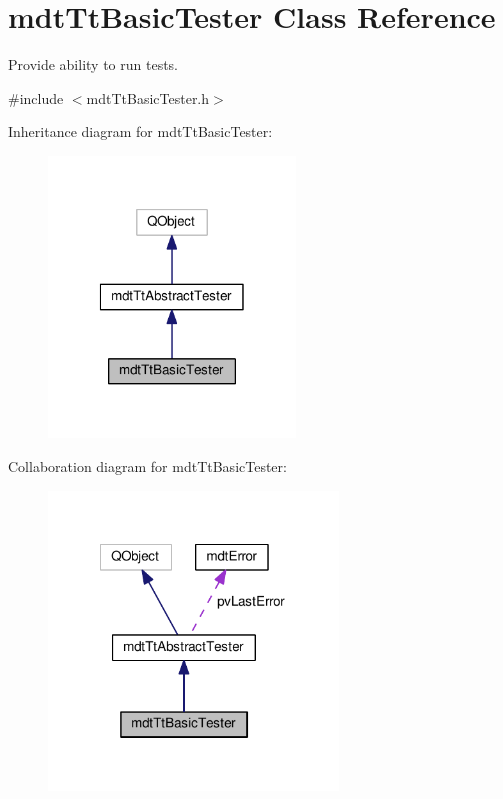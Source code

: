 \hypertarget{classmdt_tt_basic_tester}{\section{mdt\-Tt\-Basic\-Tester Class Reference}
\label{classmdt_tt_basic_tester}
}


Provide ability to run tests.  




{\ttfamily \#include $<$mdt\-Tt\-Basic\-Tester.\-h$>$}



Inheritance diagram for mdt\-Tt\-Basic\-Tester\-:\nopagebreak
\begin{figure}[H]
\begin{center}
\leavevmode
\includegraphics[width=186pt]{classmdt_tt_basic_tester__inherit__graph}
\end{center}
\end{figure}


Collaboration diagram for mdt\-Tt\-Basic\-Tester\-:\nopagebreak
\begin{figure}[H]
\begin{center}
\leavevmode
\includegraphics[width=218pt]{classmdt_tt_basic_tester__coll__graph}
\end{center}
\end{figure}
